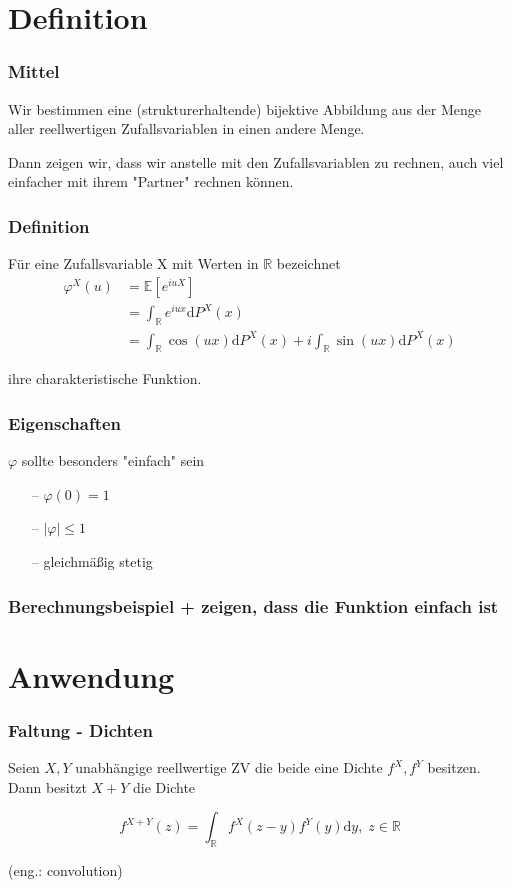 \documentclass{beamer}
\newcommand{\R}{\mathbb{R}}
\newcommand{\E}{\mathbb{E}}
\newcommand\dint{\mathord{\mathrm{d}}}
\begin{document}
\section{Definition}

\begin{frame}
\frametitle{Mittel}
Wir bestimmen eine (strukturerhaltende) bijektive Abbildung aus der Menge aller reellwertigen Zufallsvariablen in einen andere Menge.

Dann zeigen wir, dass wir anstelle mit den Zufallsvariablen zu rechnen, auch viel einfacher mit ihrem "Partner" rechnen können.
\end{frame}

\begin{frame}
\frametitle{Definition}
Für eine Zufallsvariable X mit Werten in $\R$ bezeichnet
\begin{align} \label{eq1}
\varphi^X(u) &= \E[e^{iuX}] \\
 & = \int_{\R} e^{iux} \dint P^X(x)\\
 & = \int_{\R} \cos(ux) \dint P^X(x) + i \int_{\R} \sin(ux) \dint P^X(x)
\end{align}

ihre charakteristische Funktion.

\end{frame}

\begin{frame}
\frametitle{Eigenschaften}
$\varphi$ sollte besonders "einfach" sein
\hfill \newline
\begin{itemize}
    \setlength\itemsep{1em}
    \item[--] $\varphi(0) = 1$
    \item[--] $|\varphi| \leq 1$
    \item[--] gleichmäßig stetig
\end{itemize}
\end{frame}

\begin{frame}
\frametitle{Berechnungsbeispiel + zeigen, dass die Funktion einfach ist}
\end{frame}

\section{Anwendung}

\begin{frame}
\frametitle{Faltung - Dichten}
  Seien $X, Y$ unabhängige reellwertige ZV die beide eine Dichte $f^X, f^Y$ besitzen. Dann besitzt $X+Y$ die Dichte

\begin{equation*}
  f^{X+Y}(z) = \int_{\R} f^X(z - y)f^Y(y) \dint y, \; z \in \R
\end{equation*}

(eng.: convolution)
\end{frame}
\end{document}
